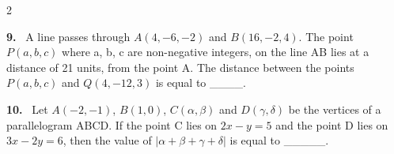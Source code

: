 \documentclass[10pt]{extarticle}
\newcommand{\qn}[1]{\par\smallskip\noindent\textbf{#1.}~}
\begin{document}
\begin{multicols}{2}
\qn{9} A line passes through $A(4,-6,-2)$ and $B(16,-2,4)$. The point $P(a,b,c)$ where a, b, c are non-negative integers, on the line AB lies at a distance of 21 units, from the point A. The distance between the points $P(a,b,c)$ and $Q(4,-12,3)$ is equal to \_\_\_\_.

\qn{10} Let $A(-2,-1)$, $B(1,0)$, $C(\alpha,\beta)$ and $D(\gamma,\delta)$ be the vertices of a parallelogram ABCD. If the point C lies on $2x-y=5$ and the point D lies on $3x-2y=6$, then the value of $|\alpha+\beta+\gamma+\delta|$ is equal to \_\_\_\_\_.

\end{multicols}
\end{document}
